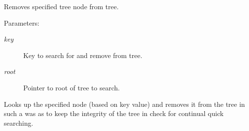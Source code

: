 Removes specified tree node from tree.

\begin{Desc}
\item[Parameters: ]\par
\begin{description}
\item[{\em 
key}]Key to search for and remove from tree. \item[{\em 
root}]Pointer to root of tree to search.\end{description}
\end{Desc}
Looks up the specified node (based on key value) and removes it from the tree in such a was as to keep the integrity of the tree in check for continual quick searching. 